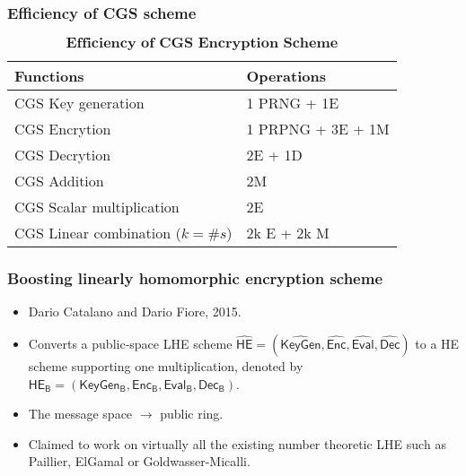 \documentclass{beamer}
\begin{document}
\begin{frame}[t]
\frametitle{Efficiency of CGS scheme}

\begin{table}
\centering
\caption{$\textbf{Efficiency of CGS Encryption Scheme}$}\label{table:Eff. CGS}
\begin{tabular}{ |p{4cm}||p{6cm}|}
 \hline
 \hline
Functions & Operations \\
 \hline\hline
 CGS Key generation       & 1 PRNG + 1E \\
 \hline
 CGS Encrytion            & 1 PRPNG + 3E + 1M \\
 \hline
 CGS Decrytion            & 2E + 1D \\
 \hline
 CGS Addition             & 2M \\
 \hline
 CGS Scalar multiplication       & 2E \\
 \hline
 CGS Linear combination ($k=\#s$)   & 2k E + 2k M \\
  \hline
\end{tabular}
\end{table}
\end{frame}


\begin{frame}[t]
\frametitle{Boosting linearly homomorphic encryption scheme}

\begin{itemize}
\item  Dario Catalano and Dario Fiore, 2015.
\vspace*{3mm}
\item  Converts a public-space LHE scheme $\mathsf{\widehat{HE}}=(\mathsf{\widehat{KeyGen}},\mathsf{\widehat{\mathsf{Enc}}},\mathsf{\widehat{Eval}},\mathsf{\widehat{Dec}})$ to a HE scheme supporting one multiplication, denoted by $\mathsf{HE_B}=(\mathsf{KeyGen_B,Enc_B,Eval_B,Dec_B})$.
\vspace*{3mm}
\item  The message space $\rightarrow$ public ring.
\vspace*{3mm}
\item  Claimed to work on virtually all the existing number theoretic LHE such as Paillier, ElGamal or Goldwasser-Micalli.

\end{itemize}
\end{frame}
\end{document}
